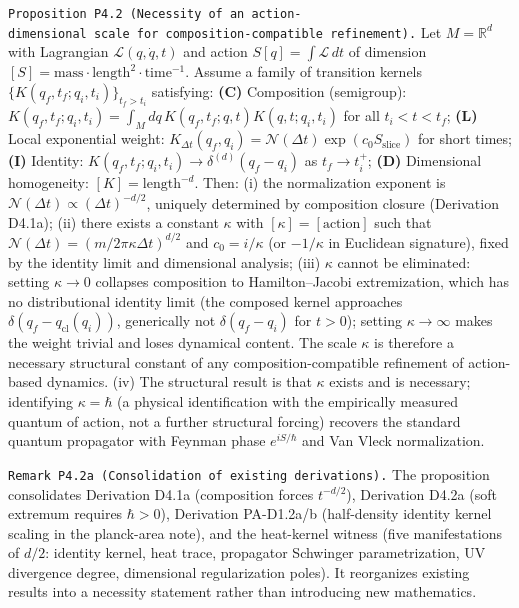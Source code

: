 \documentclass[
]{article}
\begin{document}
\texttt{Proposition\ P4.2\ (Necessity\ of\ an\ action-dimensional\ scale\ for\ composition-compatible\ refinement).}
Let \(M=\mathbb R^d\) with Lagrangian \(\mathcal L(q,\dot q,t)\) and
action \(S[q]=\int\mathcal L\,dt\) of dimension
\([S]=\mathrm{mass}\cdot\mathrm{length}^2\cdot\mathrm{time}^{-1}\).
Assume a family of transition kernels
\(\{K(q_f,t_f;q_i,t_i)\}_{t_f>t_i}\) satisfying: \textbf{(C)}
Composition (semigroup):
\(K(q_f,t_f;q_i,t_i)=\int_M dq\,K(q_f,t_f;q,t)K(q,t;q_i,t_i)\) for all
\(t_i<t<t_f\); \textbf{(L)} Local exponential weight:
\(K_{\Delta t}(q_f,q_i)=\mathcal N(\Delta t)\exp(c_0 S_{\mathrm{slice}})\)
for short times; \textbf{(I)} Identity:
\(K(q_f,t_f;q_i,t_i)\to\delta^{(d)}(q_f-q_i)\) as \(t_f\to t_i^+\);
\textbf{(D)} Dimensional homogeneity: \([K]=\mathrm{length}^{-d}\).
Then: (i) the normalization exponent is
\(\mathcal N(\Delta t)\propto(\Delta t)^{-d/2}\), uniquely determined by
composition closure (Derivation D4.1a); (ii) there exists a constant
\(\kappa\) with \([\kappa]=[\mathrm{action}]\) such that
\(\mathcal N(\Delta t)=(m/2\pi\kappa\Delta t)^{d/2}\) and
\(c_0=i/\kappa\) (or \(-1/\kappa\) in Euclidean signature), fixed by the
identity limit and dimensional analysis; (iii) \(\kappa\) cannot be
eliminated: setting \(\kappa\to0\) collapses composition to
Hamilton--Jacobi extremization, which has no distributional identity
limit (the composed kernel approaches
\(\delta(q_f-q_{\mathrm{cl}}(q_i))\), generically not
\(\delta(q_f-q_i)\) for \(t>0\)); setting \(\kappa\to\infty\) makes the
weight trivial and loses dynamical content. The scale \(\kappa\) is
therefore a necessary structural constant of any composition-compatible
refinement of action-based dynamics. (iv) The structural result is that
\(\kappa\) exists and is necessary; identifying \(\kappa=\hbar\) (a
physical identification with the empirically measured quantum of action,
not a further structural forcing) recovers the standard quantum
propagator with Feynman phase \(e^{iS/\hbar}\) and Van Vleck
normalization.

\texttt{Remark\ P4.2a\ (Consolidation\ of\ existing\ derivations).} The
proposition consolidates Derivation D4.1a (composition forces
\(t^{-d/2}\)), Derivation D4.2a (soft extremum requires \(\hbar>0\)),
Derivation PA-D1.2a/b (half-density identity kernel scaling in the
planck-area note), and the heat-kernel witness (five manifestations of
\(d/2\): identity kernel, heat trace, propagator Schwinger
parametrization, UV divergence degree, dimensional regularization
poles). It reorganizes existing results into a necessity statement
rather than introducing new mathematics.
\end{document}
